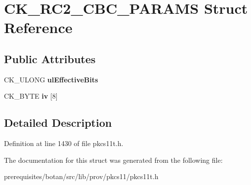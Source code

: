 \hypertarget{struct_c_k___r_c2___c_b_c___p_a_r_a_m_s}{}\section{C\+K\+\_\+\+R\+C2\+\_\+\+C\+B\+C\+\_\+\+P\+A\+R\+A\+MS Struct Reference}
\label{struct_c_k___r_c2___c_b_c___p_a_r_a_m_s}
\subsection*{Public Attributes}
\begin{DoxyCompactItemize}
\item 
\mbox{\label{struct_c_k___r_c2___c_b_c___p_a_r_a_m_s_aad0053a19c1f9bf50d50a5f2390832c3}} 
C\+K\+\_\+\+U\+L\+O\+NG {\bfseries ul\+Effective\+Bits}
\item 
\mbox{\label{struct_c_k___r_c2___c_b_c___p_a_r_a_m_s_ae1a967f8d5312ef0705687af3237231c}} 
C\+K\+\_\+\+B\+Y\+TE {\bfseries iv} \mbox{[}8\mbox{]}
\end{DoxyCompactItemize}


\subsection{Detailed Description}


Definition at line 1430 of file pkcs11t.\+h.



The documentation for this struct was generated from the following file\+:\begin{DoxyCompactItemize}
\item 
prerequisites/botan/src/lib/prov/pkcs11/pkcs11t.\+h\end{DoxyCompactItemize}
